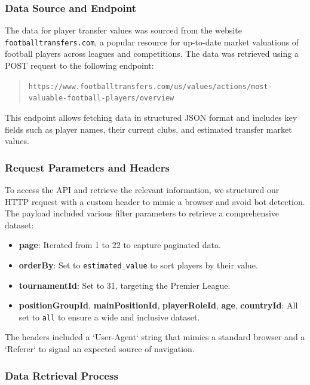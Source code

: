 \documentclass[a4paper,12pt]{article}
\begin{document}
\subsubsection{Data Source and Endpoint}

The data for player transfer values was sourced from the website \texttt{footballtransfers.com}, a popular resource for up-to-date market valuations of football players across leagues and competitions. The data was retrieved using a POST request to the following endpoint:

\begin{quote}
\texttt{https://www.footballtransfers.com/us/values/actions/most-valuable-football-players/overview}
\end{quote}

This endpoint allows fetching data in structured JSON format and includes key fields such as player names, their current clubs, and estimated transfer market values.

\subsubsection{Request Parameters and Headers}

To access the API and retrieve the relevant information, we structured our HTTP request with a custom header to mimic a browser and avoid bot detection. The payload included various filter parameters to retrieve a comprehensive dataset:

\begin{itemize}
    \item \textbf{page}: Iterated from 1 to 22 to capture paginated data.
    \item \textbf{orderBy}: Set to \texttt{estimated\_value} to sort players by their value.
    \item \textbf{tournamentId}: Set to 31, targeting the Premier League.
    \item \textbf{positionGroupId}, \textbf{mainPositionId}, \textbf{playerRoleId}, \textbf{age}, \textbf{countryId}: All set to \texttt{all} to ensure a wide and inclusive dataset.
\end{itemize}

The headers included a `User-Agent` string that mimics a standard browser and a `Referer` to signal an expected source of navigation.

\subsubsection{Data Retrieval Process}
\end{document}
